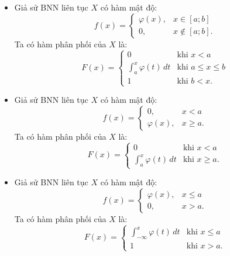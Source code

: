 \begin{itemize}
    \item Giả sử BNN liên tục $X$ có hàm mật độ:
    \[
    f(x) = \begin{cases}
    \varphi(x), & x \in [a; b] \\
    0, & x \notin [a; b].
    \end{cases}
    \]
    Ta có hàm phân phối của $X$ là:
    \[
    F(x) = \begin{cases}
    0 & \text{khi } x < a \\
    \displaystyle\int_a^x \varphi(t)\,dt & \text{khi } a \le x \le b \\
    1 & \text{khi } b < x.
    \end{cases}
    \]

    \item Giả sử BNN liên tục $X$ có hàm mật độ:
    \[
    f(x) = \begin{cases}
    0, & x < a \\
    \varphi(x), & x \ge a.
    \end{cases}
    \]
    Ta có hàm phân phối của $X$ là:
    \[
    F(x) = \begin{cases}
    0 & \text{khi } x < a \\
    \displaystyle\int_a^x \varphi(t)\,dt & \text{khi } x \ge a.
    \end{cases}
    \]

    \item Giả sử BNN liên tục $X$ có hàm mật độ:
    \[
    f(x) = \begin{cases}
    \varphi(x), & x \le a \\
    0, & x > a.
    \end{cases}
    \]
    Ta có hàm phân phối của $X$ là:
    \[
    F(x) = \begin{cases}
    \displaystyle\int_{-\infty}^x \varphi(t)\,dt & \text{khi } x \le a \\
    1 & \text{khi } x > a.
    \end{cases}
    \]
\end{itemize}

